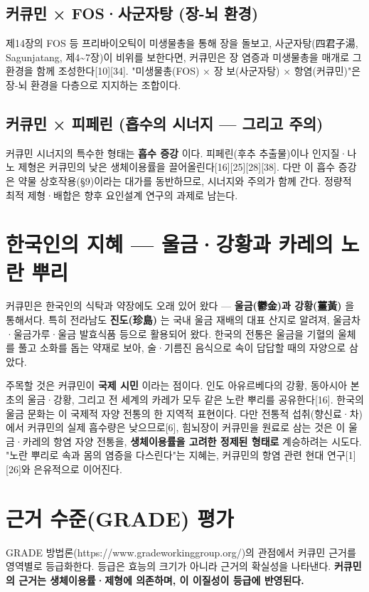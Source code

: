 \documentclass[11pt,oneside]{book}
\begin{document}
\subsection{커큐민 × FOS·사군자탕 (장-뇌 환경)}
제14장의 FOS 등 프리바이오틱이 미생물총을 통해 장을 돌보고, 사군자탕(四君子湯, Sagunjatang, 제4\textasciitilde{}7장)이 비위를 보한다면, 커큐민은 장 염증과 미생물총을 매개로 그 환경을 함께 조성한다[10][34]. "미생물총(FOS) × 장 보(사군자탕) × 항염(커큐민)"은 장-뇌 환경을 다층으로 지지하는 조합이다.

\subsection{커큐민 × 피페린 (흡수의 시너지 — 그리고 주의)}
커큐민 시너지의 특수한 형태는 \textbf{흡수 증강} 이다. 피페린(후추 추출물)이나 인지질·나노 제형은 커큐민의 낮은 생체이용률을 끌어올린다[16][25][28][38]. 다만 이 흡수 증강은 약물 상호작용(§9)이라는 대가를 동반하므로, 시너지와 주의가 함께 간다. 정량적 최적 제형·배합은 향후 요인설계 연구의 과제로 남는다.

\section{한국인의 지혜 — 울금·강황과 카레의 노란 뿌리}
커큐민은 한국인의 식탁과 약장에도 오래 있어 왔다 — \textbf{울금(鬱金)과 강황(薑黃)} 을 통해서다. 특히 전라남도 \textbf{진도(珍島)} 는 국내 울금 재배의 대표 산지로 알려져, 울금차·울금가루·울금 발효식품 등으로 활용되어 왔다. 한국의 전통은 울금을 기혈의 울체를 풀고 소화를 돕는 약재로 보아, 술·기름진 음식으로 속이 답답할 때의 자양으로 삼았다.

주목할 것은 커큐민이 \textbf{국제 시민} 이라는 점이다. 인도 아유르베다의 강황, 동아시아 본초의 울금·강황, 그리고 전 세계의 카레가 모두 같은 노란 뿌리를 공유한다[16]. 한국의 울금 문화는 이 국제적 자양 전통의 한 지역적 표현이다. 다만 전통적 섭취(향신료·차)에서 커큐민의 실제 흡수량은 낮으므로[6], 힘뇌장이 커큐민을 원료로 삼는 것은 이 울금·카레의 항염 자양 전통을, \textbf{생체이용률을 고려한 정제된 형태로} 계승하려는 시도다. "노란 뿌리로 속과 몸의 염증을 다스린다"는 지혜는, 커큐민의 항염 관련 현대 연구[1][26]와 은유적으로 이어진다.

\section{근거 수준(GRADE) 평가}
GRADE 방법론(https://www.gradeworkinggroup.org/)의 관점에서 커큐민 근거를 영역별로 등급화한다. 등급은 효능의 크기가 아니라 근거의 확실성을 나타낸다. \textbf{커큐민의 근거는 생체이용률·제형에 의존하며, 이 이질성이 등급에 반영된다.}
\end{document}
